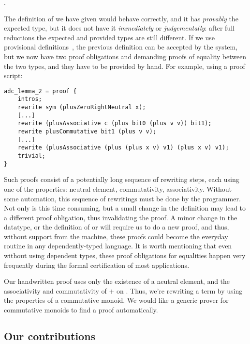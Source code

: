 .

The definition of  we have given would behave correctly, and it has
\emph{provably} the expected type, but it does not have it \emph{immediately}
or \emph{judgementally}: after full reductions the expected and provided types are still
different.
If we use provisional definitions~\cite{DBLP:conf/plpv/Brady13}, the previous
definition can be accepted by the system, but we now have two proof obligations
 and  demanding proofs of equality
between the two types, and they have to be provided by hand.
For example, using a proof script: 

\begin{lstlisting}
adc_lemma_2 = proof {
    intros;
    rewrite sym (plusZeroRightNeutral x);
    [...]
    rewrite (plusAssociative c (plus bit0 (plus v v)) bit1);
    rewrite plusCommutative bit1 (plus v v);
    [...]
    rewrite (plusAssociative (plus (plus x v) v1) (plus x v) v1);
    trivial;
}
\end{lstlisting}

Such proofs consist of a potentially long sequence of
rewriting steps, each using one of the properties: neutral element,
commutativity, associativity. Without some automation, this sequence of
rewritings must be done by the programmer.  Not only is this time consuming,
but a small change in the definition may lead to a different proof obligation,
thus invalidating the proof. 
A minor change in the datatype, or 
the definition of  or  will require us
to do a new proof, and thus, without support from the machine, these
proofs
could become the everyday routine in any dependently-typed language. It is worth mentioning that even without using dependent types, these proof obligations for equalities happen very frequently during the formal certification of most applications.

Our handwritten proof uses only the existence of a neutral
element, and the associativity and commutativity of $+$ on . Thus,
we're rewriting a term by using the properties of a commutative monoid. We
would like a generic prover for commutative monoids to find a proof 
automatically.

\subsection{Our contributions}

